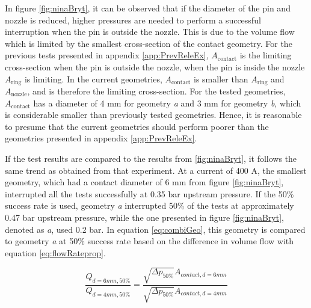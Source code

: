 \documentclass[10pt,a4paper,twoside]{article}
\begin{document}
In figure \ref{fig:ninaBryt}, it can be observed that if the diameter of the pin and nozzle is reduced, higher pressures are needed to perform a successful interruption when the pin is outside the nozzle. This is due to the volume flow which is limited by the smallest cross-section of the contact geometry. For the previous tests presented in appendix \ref{app:PrevReleEx}, $A_\mathrm{{contact}}$ is the limiting cross-section when the pin is outside the nozzle, when the pin is inside the nozzle $A_\mathrm{{ring}}$ is limiting. In the current geometries, $A_\mathrm{{contact}}$ is smaller than $A_\mathrm{{ring}}$ and $A_\mathrm{{nozzle}}$, and is therefore the limiting cross-section. For the tested geometries, $A_\mathrm{{contact}}$ has a diameter of 4 mm for geometry \textit{a} and 3 mm for geometry \textit{b}, which is considerable smaller than previously tested geometries. Hence, it is reasonable to presume that the current geometries should perform poorer than the geometries presented in appendix \ref{app:PrevReleEx}.

If the test results are compared to the results from \ref{fig:ninaBryt}, it follows the same trend as obtained from that experiment. At a current of 400 A, the smallest geometry, which had a contact diameter of 6 mm from figure \ref{fig:ninaBryt}, interrupted all the tests successfully at 0.35 bar upstream pressure. If the 50\% success rate is used, geometry \textit{a} interrupted 50\% of the tests at approximately 0.47 bar upstream pressure, while the one presented in figure \ref{fig:ninaBryt}, denoted as \textit{a}, used 0.2 bar. In equation \eqref{eq:combiGeo}, this geometry is compared to geometry \textit{a} at 50\% success rate based on the difference in volume flow with equation \eqref{eq:flowRateprop}.

\begin{equation} \label{eq:combiGeo}
\frac{Q_{d=6 mm, 50\%}}{Q_{d=4 mm, 50\%}}=\frac{\sqrt{\Delta p_{50\%}} A_{contact, d=6 mm}}{\sqrt{\Delta p_{50\%}} A_{contact, d=4 mm}}
\end{equation}
\end{document}
